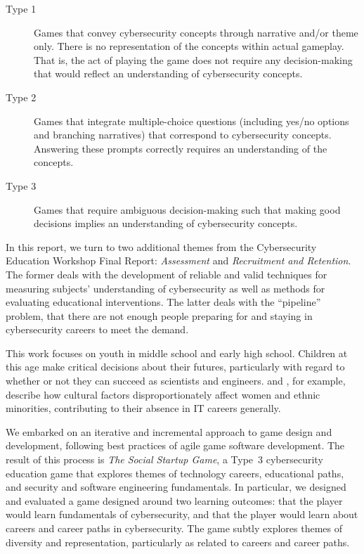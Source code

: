 \documentclass[letterpaper]{article}
\begin{document}
\begin{description}
\item[Type 1] Games that convey cybersecurity concepts through
 narrative and/or theme only. There is no representation of
 the concepts within actual gameplay. That is, the act of playing
 the game does not require any decision-making that would reflect
 an understanding of cybersecurity concepts.
\item[Type 2] Games that integrate multiple-choice questions
  (including yes/no options and branching narratives)
  that correspond to cybersecurity concepts.
  Answering these prompts correctly requires an understanding
  of the concepts.
\item[Type 3] Games that require ambiguous decision-making
 such that making good decisions implies an understanding of
 cybersecurity concepts.
 \end{description}

In this report, we turn to two additional themes from the
Cybersecurity Education Workshop Final Report:
\textit{Assessment} and \textit{Recruitment and Retention}.
The former deals with the development of reliable and valid
techniques for measuring subjects' understanding of cybersecurity
as well as methods for evaluating educational interventions.
The latter deals with the ``pipeline'' problem, that there are not enough
people preparing for and staying in cybersecurity careers to meet the demand.

This work focuses on youth in middle school and early high
school. Children at this age make critical decisions about their
futures, particularly with regard to whether or not they can succeed
as scientists and engineers. \citet{Margolis2003} and
\citet{Margolis2010}, for example, describe how cultural factors
disproportionately affect women and ethnic minorities, contributing to
their absence in IT careers generally.

We embarked on an iterative and incremental
approach to game design and development, following best practices
of agile game software development.
The result of this process is \textit{The Social Startup Game}, 
a Type~3 cybersecurity education game that explores themes of
technology careers, educational paths, and security and
software engineering fundamentals.
In particular, we designed and evaluated a game designed around
two learning outcomes: that the player would learn fundamentals of
cybersecurity, and that the player would learn about careers and
career paths in cybersecurity.
The game subtly explores themes of diversity and representation,
particularly as related to careers and career paths.
\end{document}
